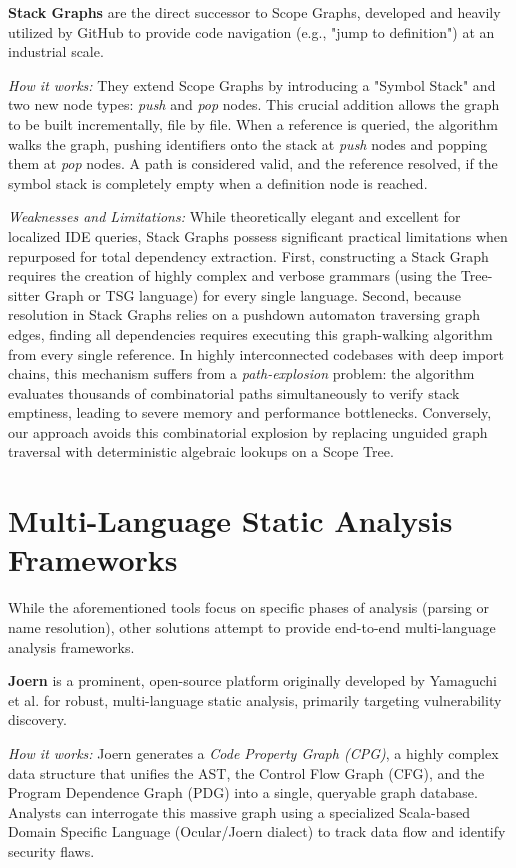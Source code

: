 \textbf{Stack Graphs} \cite{creager_stack_2023} are the direct
successor to Scope Graphs, developed and heavily utilized by GitHub
to provide code navigation (e.g., "jump to definition") at an industrial scale.

\textit{How it works:} They extend Scope Graphs by introducing a
"Symbol Stack" and two new node types: \textit{push} and \textit{pop}
nodes. This crucial addition allows the graph to be built
incrementally, file by file. When a reference is queried, the
algorithm walks the graph, pushing identifiers onto the stack at
\textit{push} nodes and popping them at \textit{pop} nodes. A path is
considered valid, and the reference resolved, if the symbol stack is
completely empty when a definition node is reached.

\textit{Weaknesses and Limitations:} While theoretically elegant and
excellent for localized IDE queries, Stack Graphs possess significant
practical limitations when repurposed for total dependency
extraction. First, constructing a Stack Graph requires the creation
of highly complex and verbose grammars (using the Tree-sitter Graph
or TSG language) for every single language. Second, because
resolution in Stack Graphs relies on a pushdown automaton traversing
graph edges, finding all dependencies requires executing this
graph-walking algorithm from every single reference. In highly
interconnected codebases with deep import chains, this mechanism
suffers from a \textit{path-explosion} problem: the algorithm
evaluates thousands of combinatorial paths simultaneously to verify
stack emptiness, leading to severe memory and performance
bottlenecks. Conversely, our approach avoids this combinatorial
explosion by replacing unguided graph traversal with deterministic
algebraic lookups on a Scope Tree.

\section{Multi-Language Static Analysis Frameworks}

While the aforementioned tools focus on specific phases of analysis
(parsing or name resolution), other solutions attempt to provide
end-to-end multi-language analysis frameworks.

\textbf{Joern} \cite{joern_docs} is a prominent, open-source
platform originally developed by Yamaguchi et al. for robust,
multi-language static analysis, primarily targeting vulnerability
discovery\cite{yamaguchi_modeling_2014}.

\textit{How it works:} Joern generates a \textit{Code Property Graph
(CPG)}, a highly complex data structure that unifies the AST, the
Control Flow Graph (CFG), and the Program Dependence Graph (PDG) into
a single, queryable graph database. Analysts can interrogate this
massive graph using a specialized Scala-based Domain Specific
Language (Ocular/Joern dialect) to track data flow and identify security flaws.


